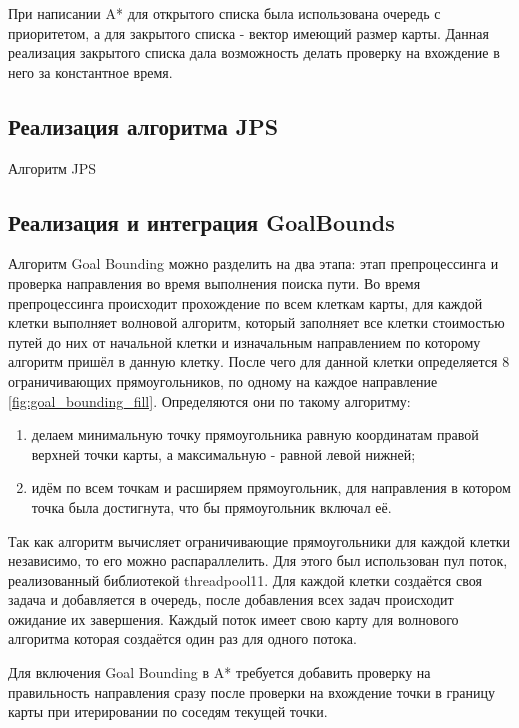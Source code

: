 При написании A* для открытого списка была использована очередь с приоритетом, а для закрытого списка - вектор имеющий размер карты. Данная реализация закрытого списка дала возможность делать проверку на вхождение в него за константное время.

\subsection{Реализация алгоритма JPS}

Алгоритм JPS 

\subsection{Реализация и интеграция GoalBounds}

Алгоритм Goal Bounding можно разделить на два этапа: этап препроцессинга и проверка направления во время выполнения поиска пути. Во время препроцессинга происходит прохождение по всем клеткам карты, для каждой клетки выполняет волновой алгоритм, который заполняет все клетки стоимостью путей до них от начальной клетки и изначальным направлением по которому алгоритм пришёл в данную клетку. После чего для данной клетки определяется 8 ограничивающих прямоугольников, по одному на каждое направление \cref{fig:goal_bounding_fill}. Определяются они по такому алгоритму: 

\begin{enumerate}
	\item делаем минимальную точку прямоугольника равную координатам правой верхней точки карты, а максимальную - равной левой нижней;
	\item идём по всем точкам и расширяем прямоугольник, для направления в котором точка была достигнута, что бы прямоугольник включал её. 
\end{enumerate}


Так как алгоритм вычисляет ограничивающие прямоугольники для каждой клетки независимо, то его можно распараллелить. Для этого был использован пул поток, реализованный библиотекой threadpool11. Для каждой клетки создаётся своя задача и добавляется в очередь, после добавления всех задач происходит ожидание их завершения. Каждый поток имеет свою карту для волнового алгоритма которая создаётся один раз для одного потока.

Для включения Goal Bounding в A* требуется добавить проверку на правильность направления сразу после проверки на вхождение точки в границу карты при итерировании по соседям текущей точки. 

